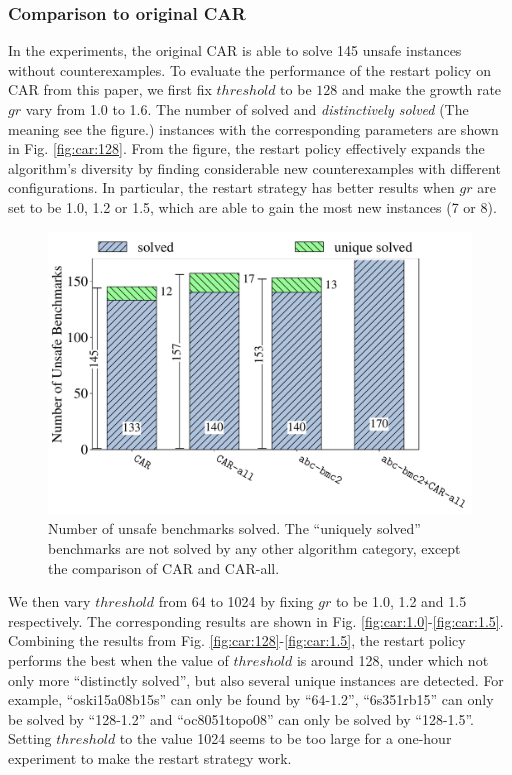 \subsubsection{Comparison to original CAR}
In the experiments, the original CAR is able to solve 145 unsafe instances without counterexamples.
To evaluate the performance of the restart policy on CAR from this paper, we first fix $threshold$ to be $128$ and make the growth rate $gr$ vary from 1.0 to 1.6. The number of solved and \emph{distinctively solved} (The meaning see the figure.) instances with the corresponding parameters are shown in Fig. \ref{fig:car:128}. From the figure, the restart policy effectively expands the algorithm's diversity by finding considerable new counterexamples with different configurations. In particular, the restart strategy has better results when $gr$ are set to be 1.0, 1.2 or 1.5, which are able to gain the most new instances (7 or 8). 
\begin{figure}[!t]
\centering
\includegraphics[width=\linewidth]{images/car-bmc.pdf} 
\caption{Number of unsafe benchmarks solved. The “uniquely solved” benchmarks are not solved by any other algorithm category, except the comparison of CAR and CAR-all.}\label{fig:compare}
\end{figure}

We then vary $threshold$ from 64 to 1024 by fixing $gr$ to be 1.0, 1.2 and 1.5 respectively. The corresponding results are shown in 
Fig. \ref{fig:car:1.0}-\ref{fig:car:1.5}. Combining the results from Fig. \ref{fig:car:128}-\ref{fig:car:1.5}, the restart policy performs the best when the value of $threshold$ is around 128, under which not only more ``distinctly solved'', but also several unique instances are detected. For example, ``oski15a08b15s'' can only be found by ``64-1.2'', ``6s351rb15'' can only be solved by ``128-1.2'' and ``oc8051topo08'' can only be solved by ``128-1.5''. Setting $threshold$ to the value 1024 seems to be too large for a one-hour experiment to make the restart strategy work. 

